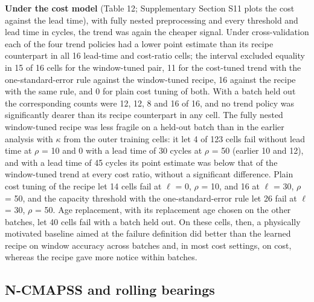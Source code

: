 \documentclass[a4paper,fleqn,doubleblind]{cas-dc}
\begin{document}
\textbf{Under the cost model} (Table 12; Supplementary Section S11 plots the cost against the lead time), with fully nested preprocessing and every threshold and lead time in cycles, the trend was again the cheaper signal. Under cross-validation each of the four trend policies had a lower point estimate than its recipe counterpart in all 16 lead-time and cost-ratio cells; the interval excluded equality in 15 of 16 cells for the window-tuned pair, 11 for the cost-tuned trend with the one-standard-error rule against the window-tuned recipe, 16 against the recipe with the same rule, and 0 for plain cost tuning of both. With a batch held out the corresponding counts were 12, 12, 8 and 16 of 16, and no trend policy was significantly dearer than its recipe counterpart in any cell. The fully nested window-tuned recipe was less fragile on a held-out batch than in the earlier analysis with $\kappa$ from the outer training cells: it let 4 of 123 cells fail without lead time at $\rho$ = 10 and 0 with a lead time of 30 cycles at $\rho$ = 50 (earlier 10 and 12), and with a lead time of 45 cycles its point estimate was below that of the window-tuned trend at every cost ratio, without a significant difference. Plain cost tuning of the recipe let 14 cells fail at $\ell$ = 0, $\rho$ = 10, and 16 at $\ell$ = 30, $\rho$ = 50, and the capacity threshold with the one-standard-error rule let 26 fail at $\ell$ = 30, $\rho$ = 50. Age replacement, with its replacement age chosen on the other batches, let 40 cells fail with a batch held out. On these cells, then, a physically motivated baseline aimed at the failure definition did better than the learned recipe on window accuracy across batches and, in most cost settings, on cost, whereas the recipe gave more notice within batches.

\subsection{N-CMAPSS and rolling bearings}
\end{document}
